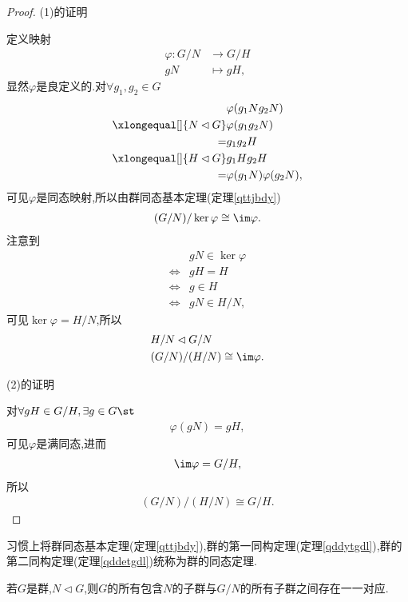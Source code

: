 \begin{proof}
    (1)的证明

    定义映射\begin{align*}
        \varphi:G/N&\to G/H\\
        gN&\mapsto gH,
    \end{align*}显然$\varphi$是良定义的.对$\forall g_1,g_2\in G$\begin{align*}
        &\varphi(g_1Ng_2N)\\
        \xlongequal[]{N\lhd G}&\varphi(g_1g_2N)\\
        =&g_1g_2H\\
        \xlongequal[]{H\lhd G}&g_1Hg_2H\\
        =&\varphi(g_1N)\varphi(g_2N),
    \end{align*}可见$\varphi$是同态映射,所以由群同态基本定理(定理\ref{qttjbdy})\begin{align*}
        (G/N)/\ker\varphi\cong\im\varphi.
    \end{align*}注意到\begin{align*}
        &gN\in\ker\varphi\\
        \iff&gH=H\\
        \iff&g\in H\\
        \iff&gN\in H/N,
    \end{align*}可见$\ker\varphi=H/N$,所以\begin{align*}
        &H/N\lhd G/N\\
        &(G/N)/(H/N)\cong\im\varphi.
    \end{align*}

    (2)的证明
    
    对$\forall gH\in G/H,\exists g\in G\st$\begin{align*}
        \varphi(gN)=gH,
    \end{align*}可见$\varphi$是满同态,进而\begin{align*}
        \im\varphi=G/H,
    \end{align*}所以\begin{align*}
        (G/N)/(H/N)\cong G/H.
    \end{align*}
\end{proof}
\begin{remark}
    习惯上将群同态基本定理(定理\ref{qttjbdy}),群的第一同构定理(定理\ref{qddytgdl}),群的第二同构定理(定理\ref{qddetgdl})统称为群的同态定理.
\end{remark}
\begin{theorem}
    若$G$是群,$N\lhd G$,则$G$的所有包含$N$的子群与$G/N$的所有子群之间存在一一对应.
\end{theorem}
